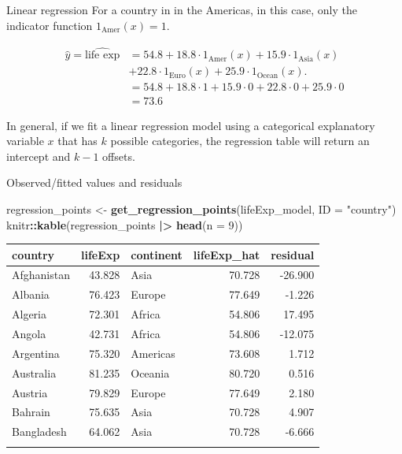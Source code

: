 \documentclass[
  ignorenonframetext,
]{beamer}
\newenvironment{Shaded}{\begin{snugshade}}{\end{snugshade}}
\newcommand{\AttributeTok}[1]{\textcolor[rgb]{0.13,0.29,0.53}{#1}}
\newcommand{\DecValTok}[1]{\textcolor[rgb]{0.00,0.00,0.81}{#1}}
\newcommand{\FunctionTok}[1]{\textcolor[rgb]{0.13,0.29,0.53}{\textbf{#1}}}
\newcommand{\NormalTok}[1]{#1}
\newcommand{\OtherTok}[1]{\textcolor[rgb]{0.56,0.35,0.01}{#1}}
\newcommand{\SpecialCharTok}[1]{\textcolor[rgb]{0.81,0.36,0.00}{\textbf{#1}}}
\newcommand{\StringTok}[1]{\textcolor[rgb]{0.31,0.60,0.02}{#1}}
\begin{document}
\begin{frame}{Linear regression}
\protect\hypertarget{linear-regression-5}{}
For a country in in the Americas, in this case, only the indicator
function \(1_{\text{Amer}}(x)=1\).

\[\begin{array}{ll}
\hat{y}=\widehat{\text{life exp}}&=54.8+18.8\cdot1_{\text{Amer}}(x)+15.9\cdot 1_{\text{Asia}}(x)\\
&+22.8\cdot 1_{\text{Euro}}(x)+25.9\cdot 1_{\text{Ocean}}(x).\\
&=54.8+18.8\cdot1+15.9\cdot 0+22.8\cdot 0+25.9\cdot 0\\
&=73.6
\end{array}\]

In general, if we fit a linear regression model using a categorical
explanatory variable \(x\) that has \(k\) possible categories, the
regression table will return an intercept and \(k-1\) offsets.
\end{frame}

\begin{frame}[fragile]{Observed/fitted values and residuals}
\protect\hypertarget{observedfitted-values-and-residuals}{}
\normalsize

\begin{Shaded}
\begin{Highlighting}[]
\NormalTok{regression\_points }\OtherTok{\textless{}{-}} \FunctionTok{get\_regression\_points}\NormalTok{(lifeExp\_model, }
                                           \AttributeTok{ID =} \StringTok{"country"}\NormalTok{) }
\NormalTok{knitr}\SpecialCharTok{::}\FunctionTok{kable}\NormalTok{(regression\_points }\SpecialCharTok{|\textgreater{}} \FunctionTok{head}\NormalTok{(}\AttributeTok{n =} \DecValTok{9}\NormalTok{))}
\end{Highlighting}
\end{Shaded}

\begin{longtable}[]{@{}lrlrr@{}}
\toprule\noalign{}
country & lifeExp & continent & lifeExp\_hat & residual \\
\midrule\noalign{}
\endhead
Afghanistan & 43.828 & Asia & 70.728 & -26.900 \\
Albania & 76.423 & Europe & 77.649 & -1.226 \\
Algeria & 72.301 & Africa & 54.806 & 17.495 \\
Angola & 42.731 & Africa & 54.806 & -12.075 \\
Argentina & 75.320 & Americas & 73.608 & 1.712 \\
Australia & 81.235 & Oceania & 80.720 & 0.516 \\
Austria & 79.829 & Europe & 77.649 & 2.180 \\
Bahrain & 75.635 & Asia & 70.728 & 4.907 \\
Bangladesh & 64.062 & Asia & 70.728 & -6.666 \\
\bottomrule\noalign{}
\end{longtable}

\normalsize
\end{frame}
\end{document}
